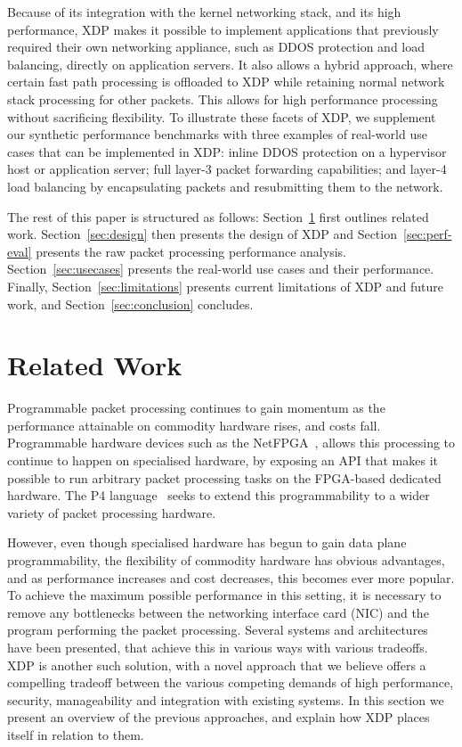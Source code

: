 \documentclass[10pt,sigconf]{acmart}
\begin{document}
Because of its integration with the kernel networking stack, and its high
performance, XDP makes it possible to implement applications that previously
required their own networking appliance, such as DDOS protection and load
balancing, directly on application servers. It also allows a hybrid approach,
where certain fast path processing is offloaded to XDP while retaining normal
network stack processing for other packets. This allows for high performance
processing without sacrificing flexibility. To illustrate these facets of XDP,
we supplement our synthetic performance benchmarks with three examples of
real-world use cases that can be implemented in XDP: inline DDOS protection on a
hypervisor host or application server; full layer-3 packet forwarding
capabilities; and layer-4 load balancing by encapsulating packets and
resubmitting them to the network.

The rest of this paper is structured as follows: Section~\ref{sec:related-work}
first outlines related work. Section~\ref{sec:design} then presents the design
of XDP and Section~\ref{sec:perf-eval} presents the raw packet processing
performance analysis. Section~\ref{sec:usecases} presents the real-world use
cases and their performance. Finally, Section~\ref{sec:limitations} presents
current limitations of XDP and future work, and Section~\ref{sec:conclusion}
concludes.

\section{Related Work}%
\label{sec:related-work}

Programmable packet processing continues to gain momentum as the performance
attainable on commodity hardware rises, and costs fall. Programmable hardware
devices such as the NetFPGA~\cite{lockwood2007netfpga}, allows this processing
to continue to happen on specialised hardware, by exposing an API that makes it
possible to run arbitrary packet processing tasks on the FPGA-based dedicated
hardware. The P4 language~\cite{bosshart2014p4} seeks to extend this
programmability to a wider variety of packet processing hardware.

However, even though specialised hardware has begun to gain data plane
programmability, the flexibility of commodity hardware has obvious advantages,
and as performance increases and cost decreases, this becomes ever more popular.
To achieve the maximum possible performance in this setting, it is necessary to
remove any bottlenecks between the networking interface card (NIC) and the
program performing the packet processing. Several systems and architectures have
been presented, that achieve this in various ways with various tradeoffs. XDP is
another such solution, with a novel approach that we believe offers a compelling
tradeoff between the various competing demands of high performance, security,
manageability and integration with existing systems. In this section we present
an overview of the previous approaches, and explain how XDP places itself in
relation to them.
\end{document}
